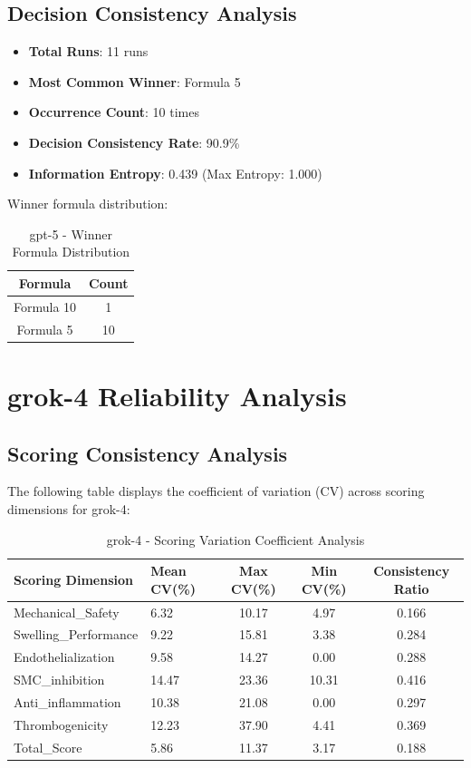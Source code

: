 \documentclass[12pt,a4paper]{article}
\begin{document}
\subsection{Decision Consistency Analysis}


\begin{itemize}
    \item \textbf{Total Runs}: 11 runs
    \item \textbf{Most Common Winner}: Formula 5
    \item \textbf{Occurrence Count}: 10 times
    \item \textbf{Decision Consistency Rate}: 90.9\%
    \item \textbf{Information Entropy}: 0.439 (Max Entropy: 1.000)
\end{itemize}

Winner formula distribution:

\begin{table}[H]
\centering
\caption{gpt-5 - Winner Formula Distribution}
\begin{tabular}{cc}
\toprule
\textbf{Formula} & \textbf{Count} \\
\midrule
Formula 10 & 1 \\
Formula 5 & 10 \\
\bottomrule
\end{tabular}
\end{table}


\newpage


\section{grok-4 Reliability Analysis}

\subsection{Scoring Consistency Analysis}

The following table displays the coefficient of variation (CV) across scoring dimensions for grok-4:

\begin{table}[H]
\centering
\caption{grok-4 - Scoring Variation Coefficient Analysis}
\begin{tabular}{llccc}
\toprule
\textbf{Scoring Dimension} & \textbf{Mean CV(\%)} & \textbf{Max CV(\%)} & \textbf{Min CV(\%)} & \textbf{Consistency Ratio} \\
\midrule
Mechanical\_Safety & 6.32 & 10.17 & 4.97 & 0.166 \\
Swelling\_Performance & 9.22 & 15.81 & 3.38 & 0.284 \\
Endothelialization & 9.58 & 14.27 & 0.00 & 0.288 \\
SMC\_inhibition & 14.47 & 23.36 & 10.31 & 0.416 \\
Anti\_inflammation & 10.38 & 21.08 & 0.00 & 0.297 \\
Thrombogenicity & 12.23 & 37.90 & 4.41 & 0.369 \\
Total\_Score & 5.86 & 11.37 & 3.17 & 0.188 \\
\bottomrule
\end{tabular}
\end{table}
\end{document}
